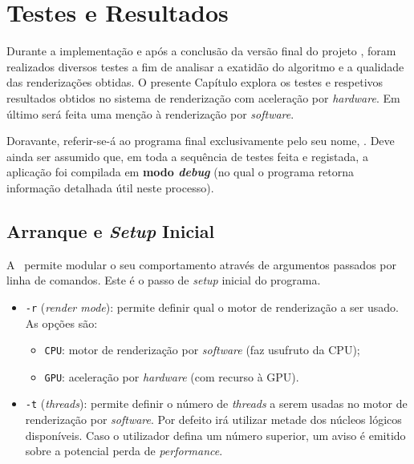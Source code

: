 \chapter{Testes e Resultados}
\label{ch::testes}


Durante a implementação e após a conclusão da versão final do projeto \theapp, foram realizados diversos testes a fim de analisar a exatidão do algoritmo e a qualidade das renderizações obtidas. O presente Capítulo explora os testes e respetivos resultados obtidos no sistema de renderização com aceleração por \textit{hardware}. Em último será feita uma menção à renderização por \textit{software}.

Doravante, referir-se-á ao programa final exclusivamente pelo seu nome, \theapp. Deve ainda ser assumido que, em toda a sequência de testes feita e registada, a aplicação foi compilada em \textbf{modo \textit{debug}} (no qual o programa retorna informação detalhada útil neste processo).


\section{Arranque e \textit{Setup} Inicial}
\label{sec::testes::start}

A \theapp~permite modular o seu comportamento através de argumentos passados por linha de comandos. Este é o passo de \textit{setup} inicial do programa.

\begin{itemize}
	\item \verb|-r| (\textit{render mode}): permite definir qual o motor de renderização a ser usado. As opções são:
	\begin{itemize}[nosep]
		\item \verb|CPU|: motor de renderização por \textit{software} (faz usufruto da \ac{CPU});
		\item \verb|GPU|: aceleração por \textit{hardware} (com recurso à \ac{GPU}).
	\end{itemize}
	
	\item \verb|-t| (\textit{threads}): permite definir o número de \textit{threads} a serem usadas no motor de renderização por \textit{software}. Por defeito irá utilizar metade dos núcleos lógicos disponíveis. Caso o utilizador defina um número superior, um aviso é emitido sobre a potencial perda de \textit{performance}.
\end{itemize}

